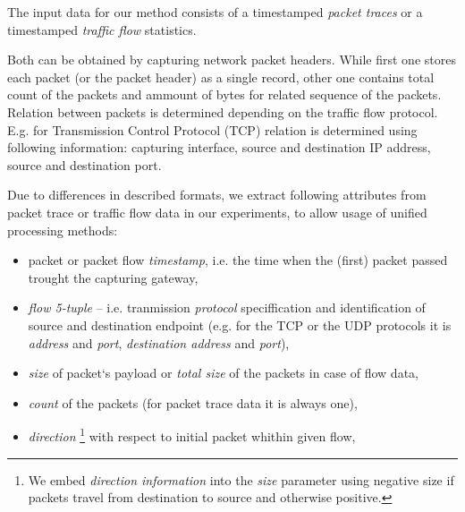The input data for our method consists of a timestamped \emph{packet traces} or a
timestamped \emph{traffic flow} statistics. 

Both can be obtained by capturing
network packet headers. While first one stores each packet (or the packet header)
as a single record,
other one contains total count of the packets and ammount of bytes for 
related sequence of the packets. Relation between packets is determined depending 
on the traffic flow protocol. E.g. for Transmission Control Protocol (TCP) relation is 
determined using following information: capturing interface, source and destination IP address,
source and destination port. 
%
%

Due to differences in described formats, we extract following attributes 
from packet trace or traffic flow data in our experiments, 
to allow usage of unified processing methods:
\begin{itemize}
	\item packet or packet flow \emph{timestamp}, i.e. the time when the (first) packet passed
	trought the capturing gateway,
	\item \emph{flow 5-tuple} -- i.e. tranmission \emph{protocol} speciffication and identification of 
	source and destination endpoint
	(e.g. for the TCP or the UDP protocols it is \emph{address} and \emph{port}, 
	\emph{destination address}  and \emph{port}),
	\item \emph{size} of packet`s payload or \emph{total size} of the packets in case of flow data,
	\item \emph{count} of the packets (for packet trace data it is always one),
	\item \emph{direction}%
	\footnote{%
		We embed \emph{direction information} 
		into the \emph{size} parameter using negative size  
		if packets travel from destination to source and otherwise positive.%
	} %
	with respect to initial packet whithin given flow,
\end{itemize}

